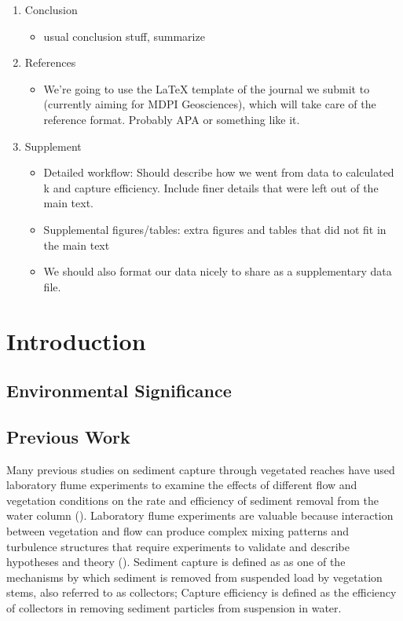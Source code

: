 \documentclass{scrreprt}
\begin{document}
\begin{enumerate}
    \item Conclusion
    \begin{itemize}
        \item usual conclusion stuff, summarize
    \end{itemize}
    
    \item References
    \begin{itemize}
        \item We're going to use the LaTeX template of the journal we submit to (currently aiming for MDPI Geosciences), which will take care of the reference format. Probably APA or something like it.
    \end{itemize}
    
    \item Supplement
    \begin{itemize}
        \item Detailed workflow: Should describe how we went from data to calculated k and capture efficiency. Include finer details that were left out of the main text.
        \item Supplemental figures/tables: extra figures and tables that did not fit in the main text
        \item We should also format our data nicely to share as a supplementary data file.
    \end{itemize}
    
\end{enumerate}


\chapter{Introduction}

\section{Environmental Significance}

\section{Previous Work}

Many previous studies on sediment capture through vegetated reaches have used laboratory flume experiments to examine the effects of different flow and vegetation conditions on the rate and efficiency of sediment removal from the water column (\cite{Fauria_2015, Palmer_2004, Purich_2007,  Zhang_reconfiguration_2020, Zhang_turbulence_2020}). Laboratory flume experiments are valuable because interaction between vegetation and flow can produce complex mixing patterns and turbulence structures that require experiments to validate and describe hypotheses and theory (\cite{Nepf_2012, Nepf_2008}). Sediment capture is defined as as one of the mechanisms by which sediment is removed from suspended load by vegetation stems, also referred to as collectors; Capture efficiency is defined as the efficiency of collectors in removing sediment particles from suspension in water. 
\end{document}
